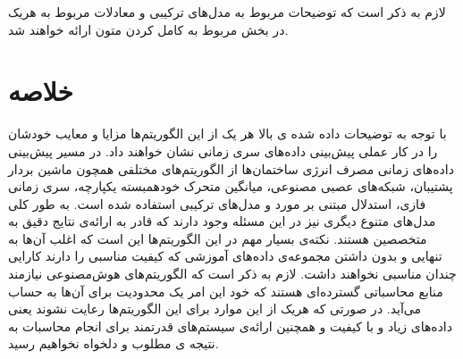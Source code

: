 لازم به ذکر است که توضیحات مربوط به مدل‌های ترکیبی و معادلات مربوط به هریک در بخش مربوط به کامل کردن متون ارائه خواهند شد.
\section{خلاصه}

با توجه به توضیحات داده شده ی بالا هر یک از این الگوریتم‌ها مزایا و معایب خودشان را در کار عملی پیش‌بینی داده‌های سری زمانی نشان خواهند داد. 
 در مسیر پیش‌بینی داده‌های زمانی مصرف انرژی ساختمان‌ها از الگوریتم‌های مختلفی همچون 
 ماشین بردار پشتیبان، شبکه‌های عصبی مصنوعی، میانگین متحرک خودهمبسته یکپارچه، سری زمانی فازی، استدلال مبتنی بر مورد و مدل‌های ترکیبی استفاده شده است.
 به طور کلی مدل‌های متنوع دیگری نیز در این مسئله وجود دارند که قادر به ارائه‌ی نتایج دقیق به متخصصین هستند. نکته‌ی بسیار مهم در این الگوریتم‌ها این است که اغلب آن‌ها به تنهایی و بدون داشتن مجموعه‌ی داده‌های آموزشی که کیفیت مناسبی را دارند
 کارایی چندان مناسبی نخواهند داشت. لازم به ذکر است که الگوریتم‌های هوش‌مصنوعی نیازمند منابع محاسباتی گسترده‌ای هستند که خود این امر یک محدودیت برای آن‌ها به حساب می‌آید.
 در صورتی که هریک از این موارد برای این الگوریتم‌ها رعایت نشوند یعنی داده‌های زیاد و با کیفیت و همچنین ارائه‌ی سیستم‌های قدرتمند برای انجام محاسبات به نتیجه ی مطلوب و دلخواه نخواهیم رسید.